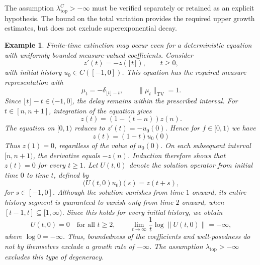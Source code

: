 \documentclass[reqno]{amsart}
\theoremstyle{plain}
\newtheorem{example}{Example}[section]
\numberwithin{equation}{section}
\numberwithin{definition}{section}
\begin{document}
The assumption $\lambda_{\mathrm{top}}^C>-\infty$
must be verified separately or retained as an explicit
hypothesis. The bound on the total variation provides
the required upper growth estimates, but does not
exclude superexponential decay.

\begin{example}
Finite-time extinction may occur even for a deterministic
equation with uniformly bounded measure-valued coefficients.
Consider
\begin{equation*}
    z'(t)=-z(\lfloor t\rfloor),\qquad t\geq0,
\end{equation*}
with initial history $u_0\in C([-1,0])$.
This equation has the required measure representation with
\begin{equation*}
    \mu_t=-\delta_{\lfloor t\rfloor-t},
    \qquad
    \|\mu_t\|_{\mathrm{TV}}=1.
\end{equation*}
Since $\lfloor t\rfloor-t\in(-1,0]$, the delay remains
within the prescribed interval. For $t\in[n,n+1]$, integration of the equation gives
\begin{equation*}
    z(t)=(1-(t-n))z(n).
\end{equation*}
The
equation on $[0,1)$ reduces to $z'(t)=-u_0(0)$. Hence for $f\in [0,1)$ we have 
\begin{equation*}
    z(t)=(1-t)u_0(0) 
\end{equation*}
Thus $z(1)=0$, regardless of the value of $u_0(0)$.
On each subsequent interval $[n,n+1)$, the derivative
equals $-z(n)$. Induction therefore shows that
$z(t)=0$ for every $t\geq1$. Let $U(t,0)$ denote the solution operator from initial
time $0$ to time $t$, defined by
\begin{equation*}
    \bigl(U(t,0)u_0\bigr)(s)=z(t+s),
\end{equation*}
for $s\in[-1,0]$. 
Although the solution vanishes from time $1$ onward,
its entire history segment is guaranteed to vanish
only from time $2$ onward, when $[t-1,t]\subseteq[1,\infty)$.
Since this holds for every initial history, we obtain
\begin{equation*}
    U(t,0)=0\quad\text{for all }t\geq2,
    \qquad
    \lim_{t\to\infty}\frac{1}{t}\log\|U(t,0)\|=-\infty,
\end{equation*}
where $\log0=-\infty$. Thus, boundedness of the coefficients and well-posedness
do not by themselves exclude a growth rate of $-\infty$.
The assumption $\lambda_{\mathrm{top}}>-\infty$ excludes
this type of degeneracy.
\end{example}
\end{document}
